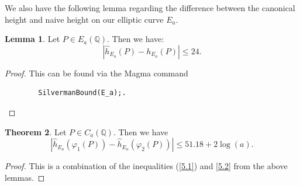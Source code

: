 \documentclass{article}
\newcommand{\Q}{\mathbb{Q}}
\theoremstyle{definition}
\newtheorem{theorem}{Theorem}[section]
\newtheorem{lemma}[theorem]{Lemma}
\begin{document}
We also have the following lemma regarding the difference between the canonical height and naive height on our elliptic curve $E_a$.
\begin{lemma}\label{silvermanbound}
    Let $P \in E_a(\Q)$. Then we have:
    \begin{equation}\label{5.2}
        \left| \hat{h}_{E_a}(P) - h_{E_a}(P)\right| \leq 24.
    \end{equation}
\end{lemma}
\begin{proof}
    This can be found via the Magma command \begin{verbatim}
        SilvermanBound(E_a);. 
    \end{verbatim} 
\end{proof}

\begin{theorem}\label{canonicalheightbound}
    Let $P \in C_a(\Q)$. Then we have 
    \begin{equation*}
        \left| \hat{h}_{E_a}(\varphi_1(P)) - \hat{h}_{E_a}(\varphi_2(P)) \right| \leq 51.18 + 2 \log(a).
    \end{equation*}
\end{theorem}
\begin{proof}
    This is a combination of the inequalities (\ref{5.1}) and \ref{5.2} from the above lemmas.
\end{proof}
\end{document}

